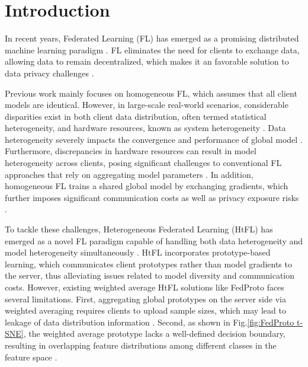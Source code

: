 \section{Introduction}
\label{sec:introduction}

In recent years, Federated Learning (FL) has emerged as a promising distributed machine learning paradigm \cite{promising}. FL eliminates the need for clients to exchange data, allowing data to remain decentralized, which makes it an favorable solution to data privacy challenges \cite{uncentralized, fedavg}.

Previous work mainly focuses on homogeneous FL, which assumes that all client models are identical. However, in large-scale real-world scenarios, considerable disparities exist in both client data distribution, often termed statistical heterogeneity, and hardware resources, known as system heterogeneity \cite{data_and_model_heterogenous, FedProx}. Data heterogeneity severely impacts the convergence and performance of global model \cite{model-training-on-noniid-data, fl_challenges_methods_directions}. Furthermore, discrepancies in hardware resources can result in model heterogeneity across clients, posing significant challenges to conventional FL approaches that rely on aggregating model parameters \cite{data_and_model_heterogenous, FLadvance}. In addition, homogeneous FL trains a shared global model by exchanging gradients, which further imposes significant communication costs as well as privacy exposure risks \cite{aggregating-vs-privacy, fedtgp}.

To tackle these challenges, Heterogeneous Federated Learning (HtFL) has emerged as a novel FL paradigm capable of handling both data heterogeneity and model heterogeneity simultaneously \cite{tan2022fedproto, yi2023fedgh, fedtgp}. HtFL incorporates prototype-based learning, which communicates client prototypes rather than model gradients to the server, thus alleviating issues related to model diversity and communication costs. However, existing weighted average HtFL solutions like FedProto \cite{tan2022fedproto} faces several limitations. First, aggregating global prototypes on the server side via weighted averaging requires clients to upload sample sizes, which may lead to leakage of data distribution information \cite{yi2023fedgh}. Second, as shown in Fig.\ref{fig:FedProto t-SNE}, the weighted average prototype lacks a well-defined decision boundary, resulting in overlapping feature distributions among different classes in the feature space \cite{fedtgp}.

